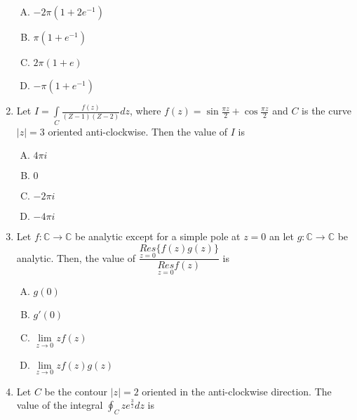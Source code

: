 \documentclass[12pt,a4paper]{article}
\begin{document}
\begin{enumerate}
\begin{enumerate}[(A)]
\item $
-2 \pi(1+2 e^{-1})
$

\item $
\pi(1+e^{-1})
$

\item $
2 \pi(1+e) 
$

\item $
- \pi(1+e^{-1})
$

\end{enumerate}

\item Let $ I=\int\limits_{C} \frac{f(z)}{(Z-1)(Z-2)} dz$, where $f(z)= \sin \frac{\pi z}{2} + \cos \frac{\pi z}{2} $ and $C$ is the curve $ \mid z \mid =3 $ oriented anti-clockwise. Then the value of $I$ is

\begin{enumerate}[(A)]

\item $
4 \pi i
$

\item $
0
$

\item $
- 2 \pi i
$

\item $
- 4 \pi i
$

\end{enumerate}

\item Let $ f : \mathbb{C} \rightarrow \mathbb{C} $ be analytic except for a simple pole at $z=0$ an let $ g : \mathbb{C} \rightarrow \mathbb{C} $ be analytic.
Then, the value of $\dfrac{\underset{z=0}{Res} \lbrace f(z)g(z)\rbrace }{\underset{z=0}{Res} f(z)} $ is

\begin{enumerate}[(A)]

\item $
g(0)
$

\item $
g'(0)
$

\item $
\lim\limits_{z \to 0} z f(z)
$
       
\item $
\lim\limits_{z \to 0} z f(z) g(z)
$

\end{enumerate}

\item Let $C$ be the contour $ \mid z \mid = 2$ oriented in the anti-clockwise direction. The value of the integral $\oint_{C} z e ^{\frac{3}{z}} dz $ is


\end{enumerate}
\end{document}

